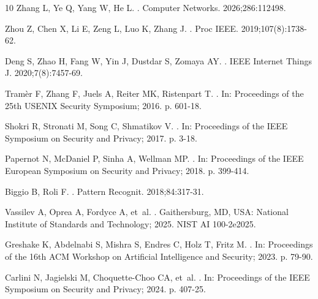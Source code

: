 \begin{thebibliography}{10}
Zhang L, Ye Q, Yang W, He L.
.
\newblock Computer Networks. 2026;286:112498.

Zhou Z, Chen X, Li E, Zeng L, Luo K, Zhang J.
.
\newblock Proc IEEE. 2019;107(8):1738-62.

Deng S, Zhao H, Fang W, Yin J, Dustdar S, Zomaya AY.
.
\newblock IEEE Internet Things J. 2020;7(8):7457-69.

Tram{\`e}r F, Zhang F, Juels A, Reiter MK, Ristenpart T.
.
\newblock In: Proceedings of the 25th USENIX Security Symposium; 2016. p.
  601-18.

Shokri R, Stronati M, Song C, Shmatikov V.
.
\newblock In: Proceedings of the IEEE Symposium on Security and Privacy; 2017.
  p. 3-18.

Papernot N, McDaniel P, Sinha A, Wellman MP.
.
\newblock In: Proceedings of the IEEE European Symposium on Security and
  Privacy; 2018. p. 399-414.

Biggio B, Roli F.
.
\newblock Pattern Recognit. 2018;84:317-31.

Vassilev A, Oprea A, Fordyce A, et~al.
.
\newblock Gaithersburg, MD, USA: National Institute of Standards and
  Technology; 2025. NIST AI 100-2e2025.

Greshake K, Abdelnabi S, Mishra S, Endres C, Holz T, Fritz M.
.
\newblock In: Proceedings of the 16th ACM Workshop on Artificial Intelligence
  and Security; 2023. p. 79-90.

Carlini N, Jagielski M, Choquette-Choo CA, et~al.
.
\newblock In: Proceedings of the IEEE Symposium on Security and Privacy; 2024.
  p. 407-25.


\end{thebibliography}

